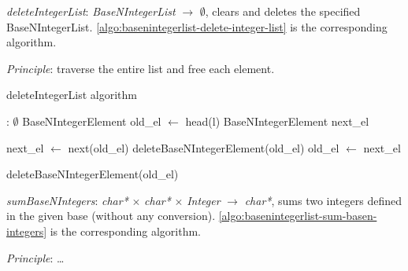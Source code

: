 \documentclass[book, nodocumentinfo]{upmethodology-document}
\begin{document}

\emph{deleteIntegerList}: \emph{BaseNIntegerList} \(\rightarrow\) \(\emptyset\),
clears and deletes the specified BaseNIntegerList.
\ref{algo:basenintegerlist-delete-integer-list} is the corresponding algorithm.

\emph{Principle}: traverse the entire list and free each element.

\begin{algorithm}[H]
    \label{algo:basenintegerlist-delete-integer-list}
    \caption{deleteIntegerList algorithm}

    \begin{algorithmic}
         : \(\emptyset\)
                \State BaseNIntegerElement old\_el \(\leftarrow\) head(l)
                \State BaseNIntegerElement next\_el

                    \State next\_el \(\leftarrow\) next(old\_el)
                    \State deleteBaseNIntegerElement(old\_el)
                    \State old\_el \(\leftarrow\) next\_el
                \EndWhile

                \State deleteBaseNIntegerElement(old\_el)
            \EndIf
        \EndFunction
    \end{algorithmic}
\end{algorithm}


\emph{sumBaseNIntegers}: \emph{char*} \(\times\) \emph{char*} \(\times\) \emph{Integer} \(\rightarrow\) \emph{char*},
sums two integers defined in the given base (without any conversion).
\ref{algo:basenintegerlist-sum-basen-integers} is the corresponding algorithm.

\emph{Principle}: …
\end{document}

